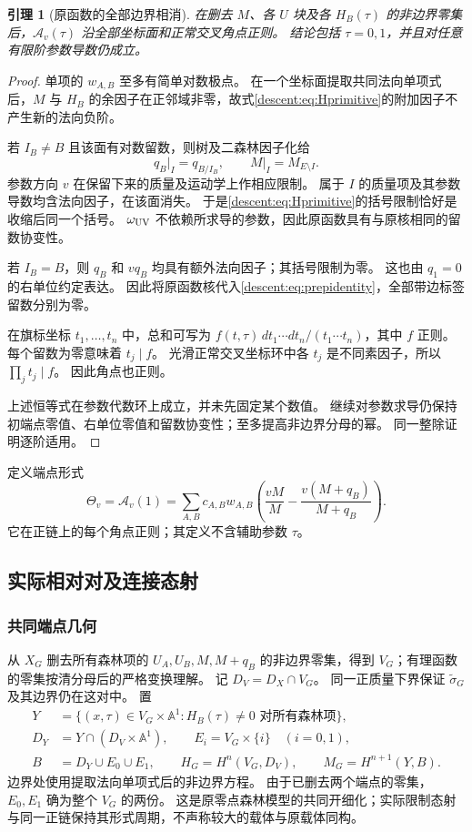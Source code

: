 \documentclass[11pt,a4paper,oneside]{ctexart}
\theoremstyle{cnplain}
\newtheorem{lemma}[theorem]{引理}
\theoremstyle{definition}
\theoremstyle{remark}
\numberwithin{equation}{section}
\begin{document}
\begin{lemma}[原函数的全部边界相消]\label{descent:lem:cancel}
在删去 $M$、各 $U$ 块及各 $H_B(\tau)$ 的非边界零集后，$\mathcal A_v(\tau)$ 沿全部坐标面和正常交叉角点正则。
结论包括 $\tau=0,1$，并且对任意有限阶参数导数仍成立。
\end{lemma}
\begin{proof}
单项的 $w_{A,B}$ 至多有简单对数极点。
在一个坐标面提取共同法向单项式后，$M$ 与 $H_B$ 的余因子在正邻域非零，故式\eqref{descent:eq:Hprimitive}的附加因子不产生新的法向负阶。

若 $I_B\ne B$ 且该面有对数留数，则树及二森林因子化给
\[
 q_B\big|_I=q_{B/I_B},\qquad M\big|_I=M_{E\setminus I}.
\]
参数方向 $v$ 在保留下来的质量及运动学上作相应限制。
属于 $I$ 的质量项及其参数导数均含法向因子，在该面消失。
于是\eqref{descent:eq:Hprimitive}的括号限制恰好是收缩后同一个括号。
$\omega_{\rm UV}$ 不依赖所求导的参数，因此原函数具有与原核相同的留数协变性。

若 $I_B=B$，则 $q_B$ 和 $vq_B$ 均具有额外法向因子；其括号限制为零。
这也由 $q_1=0$ 的右单位约定表达。
因此将原函数核代入\eqref{descent:eq:prepidentity}，全部带边标签留数分别为零。

在旗标坐标 $t_1,\ldots,t_n$ 中，总和可写为
$f(t,\tau)\,dt_1\cdots dt_n/(t_1\cdots t_n)$，其中 $f$ 正则。
每个留数为零意味着 $t_j\mid f$。
光滑正常交叉坐标环中各 $t_j$ 是不同素因子，所以 $\prod_jt_j\mid f$。
因此角点也正则。

上述恒等式在参数代数环上成立，并未先固定某个数值。
继续对参数求导仍保持初端点零值、右单位零值和留数协变性；至多提高非边界分母的幂。
同一整除证明逐阶适用。
\end{proof}

定义端点形式
\begin{equation}\label{descent:eq:Theta}
 \Theta_v=\mathcal A_v(1)
   =\sum_{A,B}c_{A,B}w_{A,B}
       \left(\frac{vM}{M}-\frac{v(M+q_B)}{M+q_B}\right).
\end{equation}
它在正链上的每个角点正则；其定义不含辅助参数 $\tau$。


\subsection{实际相对对及连接态射}
\subsubsection{共同端点几何}
从 $X_G$ 删去所有森林项的 $U_A,U_B,M,M+q_B$ 的非边界零集，得到 $V_G$；有理函数的零集按清分母后的严格变换理解。
记 $D_V=D_X\cap V_G$。
同一正质量下界保证 $\widetilde\sigma_G$ 及其边界仍在这对中。
置
\begin{align}\label{descent:eq:pairs}
 Y&=\{(x,\tau)\in V_G\times\mathbb A^1:
                         H_B(\tau)\ne0\text{ 对所有森林项}\},\nonumber\\
 D_Y&=Y\cap(D_V\times\mathbb A^1),\qquad
 E_i=V_G\times\{i\}\quad(i=0,1),\nonumber\\
 B&=D_Y\cup E_0\cup E_1,\qquad
 H_G=H^n(V_G,D_V),\qquad M_G=H^{n+1}(Y,B).
\end{align}
边界处使用提取法向单项式后的非边界方程。
由于已删去两个端点的零集，$E_0,E_1$ 确为整个 $V_G$ 的两份。
这是原零点森林模型的共同开细化；实际限制态射与同一正链保持其形式周期，不声称较大的载体与原载体同构。
\end{document}
